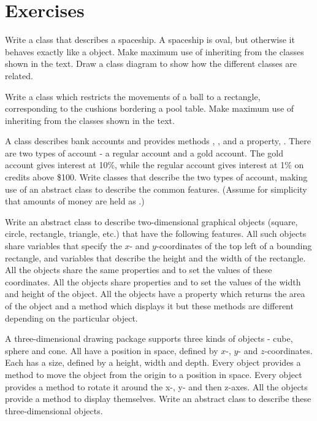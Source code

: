 	\section{Exercises}
		\begin{EXE}
			\item	{} Write a class  that describes a spaceship. A spaceship is oval, but otherwise it behaves exactly like a  object. Make maximum use of inheriting from the classes shown in the text.
			Draw a class diagram to show how the different classes are related.
			\item	{} Write a class  which restricts the movements of a ball to a rectangle, corresponding to the cushions bordering a pool table. Make maximum use of inheriting from the classes shown in the text.
			\item	{} A class describes bank accounts and provides methods , ,  and a  property, . There are two types of account - a regular account and a gold account. The gold account gives interest at 10\%, while the regular account gives interest at 1\% on credits above \$100. Write classes that describe the two types of account, making use of an abstract class to describe the common features. (Assume for simplicity that amounts of money are held as .)
			\item	Write an abstract class to describe two-dimensional graphical objects (square, circle, rectangle, triangle, etc.) that have the following features. All such objects share  variables that specify the $x$- and $y$-coordinates of the top left of a bounding rectangle, and  variables that describe the height and the width of the rectangle. All the objects share the same properties  and  to set the values of these coordinates. All the objects share properties  and  to set the values of the width and height of the object. All the objects have a property  which returns the area of the object and a method  which displays it but these methods are different depending on the particular object.
			\item	A three-dimensional drawing package supports three kinds of objects - cube, sphere and cone. All have a position in space, defined by $x$-, $y$- and $z$-coordinates. Each has a size, defined by a height, width and depth. Every object provides a method to move the object from the origin to a position in space. Every object provides a method to rotate it around the x-, y- and then z-axes. All the objects provide a method to display themselves. Write an abstract class to describe these three-dimensional objects.
		\end{EXE}


